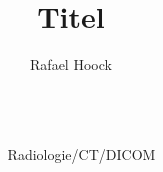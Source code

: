 \documentclass[final,hyperref={pdfpagelabels=false}]{beamer}
\title{\huge Titel}
\author{Rafael Hoock}
\institute{Fachbereich Informatik und Mikrosystemtechnik}
\begin{document}

\begin{frame}[t] %

\begin{columns}[t] %

\begin{column}{.025\textwidth}\end{column} %

\begin{column}{.465\textwidth} %


\begin{block}{Radiologie/CT/DICOM}
    



\end{block}

\vspace{0.125cm}

\end{column}


\end{columns}
\end{frame}
\end{document}

